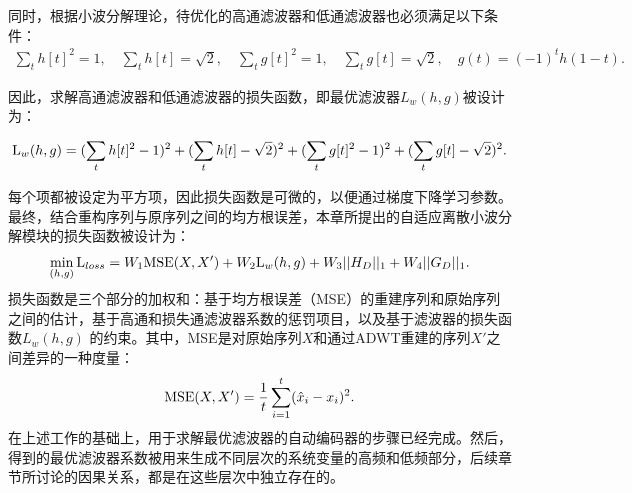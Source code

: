 同时，根据小波分解理论，待优化的高通滤波器和低通滤波器也必须满足以下条件：
\begin{align*}
\sum_{t}h[t]^{2} = 1,\quad
\sum_{t}h[t] = \sqrt{2},\quad
\sum_{t}g[t]^{2} = 1,\quad
\sum_{t}g[t] = \sqrt{2},\quad
g(t) = (-1)^{t}h(1-t).
\end{align*}

因此，求解高通滤波器和低通滤波器的损失函数，即最优滤波器$L_{w}(h,g)$被设计为：

\begin{align}\label{loss}
{\rm L}_{w}(h,g) = (\sum_{t}h[t]^{2} - 1)^2 + (\sum_{t}h[t] - \sqrt{2})^2
           + (\sum_{t}g[t]^{2} - 1)^2 + (\sum_{t}g[t] - \sqrt{2})^2.
\end{align}

每个项都被设定为平方项，因此损失函数是可微的，以便通过梯度下降学习参数。最终，结合重构序列与原序列之间的均方根误差，本章所提出的自适应离散小波分解模块的损失函数被设计为：
\begin{equation}\label{loss2}
\min\limits_{(h,g)} {\rm L}_{loss} = W_{1} {\rm MSE}(X,X')+W_{2} {\rm L}_{w}(h,g)+W_{3} ||H_{D}||_{1}+W_{4} ||G_{D}||_{1}.
\end{equation}
损失函数是三个部分的加权和：基于均方根误差（MSE）的重建序列和原始序列之间的估计，基于高通和损失通滤波器系数的惩罚项目，以及基于滤波器的损失函数$L_{w}(h,g)$ 的约束。其中，MSE是对原始序列$X$和通过ADWT重建的序列$X'$之间差异的一种度量：
 \begin{equation}\label{mse}
{\rm MSE}(X, X') = {\frac{1}{t}\sum\limits_{i=1}\limits^{t}(\hat{x}_{i}-x_{i})^2}.
\end{equation}
在上述工作的基础上，用于求解最优滤波器的自动编码器的步骤已经完成。然后，得到的最优滤波器系数被用来生成不同层次的系统变量的高频和低频部分，后续章节所讨论的因果关系，都是在这些层次中独立存在的。
